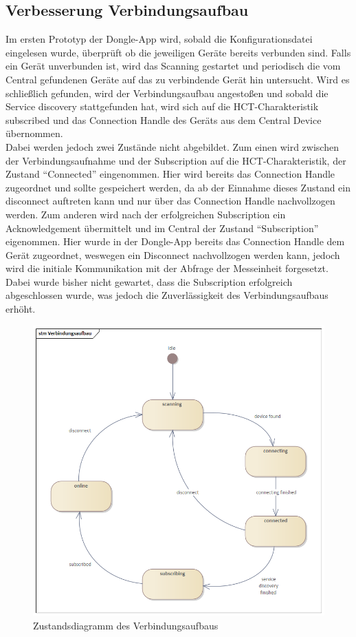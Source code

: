 \subsection{Verbesserung Verbindungsaufbau}
Im ersten Prototyp der Dongle-App wird, sobald die Konfigurationsdatei eingelesen wurde, überprüft ob die jeweiligen Geräte bereits verbunden sind. Falls ein Gerät unverbunden ist, wird das Scanning gestartet und periodisch die vom Central gefundenen Geräte auf das zu verbindende Gerät hin untersucht. Wird es schließlich gefunden, wird der Verbindungsaufbau angestoßen und sobald die Service discovery stattgefunden hat, wird sich auf die HCT-Charakteristik subscribed und das Connection Handle des Geräts aus dem Central Device übernommen. \\
Dabei werden jedoch zwei Zustände nicht abgebildet. Zum einen wird zwischen der Verbindungsaufnahme und der Subscription auf die HCT-Charakteristik, der Zustand ``Connected'' eingenommen. Hier wird bereits das Connection Handle zugeordnet und sollte gespeichert werden, da ab der Einnahme dieses Zustand ein disconnect auftreten kann und nur über das Connection Handle nachvollzogen werden. Zum anderen wird nach der erfolgreichen Subscription ein Acknowledgement übermittelt und im Central der Zustand ``Subscription'' eigenommen. Hier wurde in der Dongle-App bereits das Connection Handle dem Gerät zugeordnet, weswegen ein Disconnect nachvollzogen werden kann, jedoch wird die initiale Kommunikation mit der Abfrage der Messeinheit forgesetzt. Dabei wurde bisher nicht gewartet, dass die Subscription erfolgreich abgeschlossen wurde, was jedoch die Zuverlässigkeit des Verbindungsaufbaus erhöht.

\begin{figure}[H] 
	\centering
	\includegraphics[width=\textwidth]{figures/Verbindungsaufbau.png}
	\caption{Zustandsdiagramm des Verbindungsaufbaus}
\end{figure}



